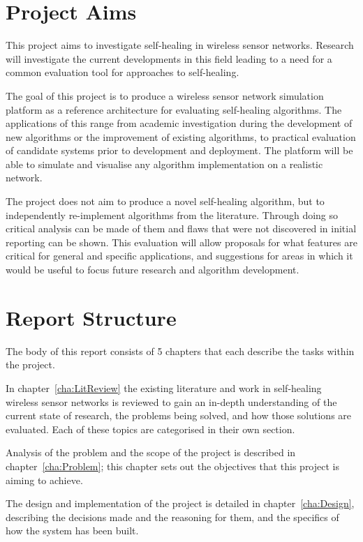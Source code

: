 \documentclass[authoryearcitations]{UoYCSproject}
\begin{document}
\section{Project Aims}

This project aims to investigate self-healing in wireless sensor networks. Research will investigate the current developments in this field leading to a need for a common evaluation tool for approaches to self-healing.

The goal of this project is to produce a wireless sensor network simulation platform as a reference architecture for evaluating self-healing algorithms. The applications of this range from academic investigation during the development of new algorithms or the improvement of existing algorithms, to practical evaluation of candidate systems prior to development and deployment. The platform will be able to simulate and visualise any algorithm implementation on a realistic network.

The project does not aim to produce a novel self-healing algorithm, but to independently re-implement algorithms from the literature. Through doing so critical analysis can be made of them and flaws that were not discovered in initial reporting can be shown. This evaluation will allow proposals for what features are critical for general and specific applications, and suggestions for areas in which it would be useful to focus future research and algorithm development.

\section{Report Structure}

The body of this report consists of 5 chapters that each describe the tasks within the project.

In chapter~\ref{cha:LitReview} the existing literature and work in self-healing wireless sensor networks is reviewed to gain an in-depth understanding of the current state of research, the problems being solved, and how those solutions are evaluated. Each of these topics are categorised in their own section.

Analysis of the problem and the scope of the project is described in chapter~\ref{cha:Problem}; this chapter sets out the objectives that this project is aiming to achieve.

The design and implementation of the project is detailed in chapter~\ref{cha:Design}, describing the decisions made and the reasoning for them, and the specifics of how the system has been built.
\end{document}
